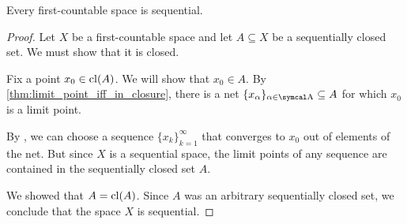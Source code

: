 \begin{proposition}\label{thm:first_countable_spaces_are_sequential}
  Every first-countable space is sequential.
\end{proposition}
\begin{proof}
  Let \( X \) be a first-countable space and let \( A \subseteq X \) be a sequentially closed set. We must show that it is closed.

  Fix a point \( x_0 \in \operatorname{cl}(A) \). We will show that \( x_0 \in A \). By \cref{thm:limit_point_iff_in_closure}, there is a net \( \{ x_\al \}_{\al \in \CA} \subseteq A \) for which \( x_0 \) is a limit point.

  By , we can choose a sequence \( \{ x_k \}_{k=1}^\infty \) that converges to \( x_0 \) out of elements of the net. But since \( X \) is a sequential space, the limit points of any sequence are contained in the sequentially closed set \( A \).

  We showed that \( A = \operatorname{cl}(A) \). Since \( A \) was an arbitrary sequentially closed set, we conclude that the space \( X \) is sequential.
\end{proof}
